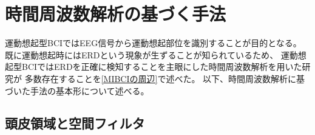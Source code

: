 \section{\mc 時間周波数解析の基づく手法}
運動想起型BCIではEEG信号から運動想起部位を識別することが目的となる。
既に運動想起時にはERDという現象が生ずることが知られているため\cite{ERDとERS}、
運動想起型BCIではERDを正確に検知することを主眼にした時間周波数解析を用いた研究が
多数存在することを\ref{MIBCIの周辺}で述べた。
以下、時間周波数解析に基づいた手法の基本形について述べる。


\subsection{\mc 頭皮領域と空間フィルタ}
